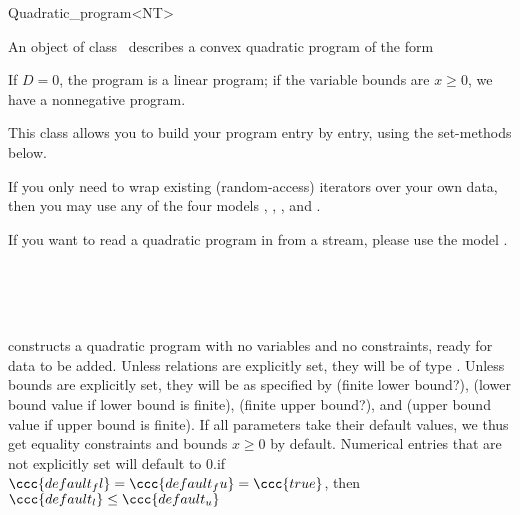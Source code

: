 \begin{ccRefClass}{Quadratic_program<NT>}


\ccDefinition
An object of class \ccRefName\ describes a convex quadratic program of the form


If $D=0$, the program is
a linear program; if the variable bounds are $x\geq 0$, we have a 
nonnegative program.

This class allows you to build your program entry by entry, using
the set-methods below. 

If you only need to wrap existing (random-access)
iterators over your own data, then you may use any of the four models
, 
, 
, and
. 

If you want to read a quadratic program in  from a stream, 
please use the model .

\ccIsModel
{}\\
\\
\\

\ccTypes


\ccCreation
\ccIndexClassCreation
{}

{constructs a quadratic program with no variables and no constraints, ready
for data to be added.  Unless relations are explicitly set, they will 
be of type . Unless bounds are explicitly set, they
will be as specified by  (finite lower bound?), 
 (lower bound value if lower bound is finite),
 (finite upper bound?), and
 (upper bound value if upper bound is finite). If all
parameters take their default values, we thus get equality constraints 
and bounds $x\geq 0$ by default. Numerical entries that are not 
explicitly set will default to $0$.\ccPrecond if 
  $\ccc{default_fl}=\ccc{default_fu}=\ccc{true}$, then
  $\ccc{default_l}\leq\ccc{default_u}$}


\end{ccRefClass}
